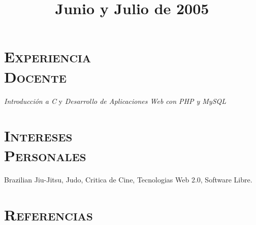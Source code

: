 \begin{resume}
 \section{\textsc{Experiencia \\ Docente}}
 \title{\textbf{Junio y Julio de 2005}}
 \begin{position}
 \emph{Introducci\'{o}n a C} y \emph{Desarrollo de Aplicaciones Web
 con PHP y MySQL}
 \end{position}




\section{\textsc{Intereses\\ Personales}}
\employer{}
\title{}
\location{} 
\dates{}
Brazilian Jiu-Jitsu, Judo, Critica de Cine, Tecnologias Web 2.0, Software Libre.
\newline     
\newline


\section{\textsc{Referencias}}


\end{resume}
